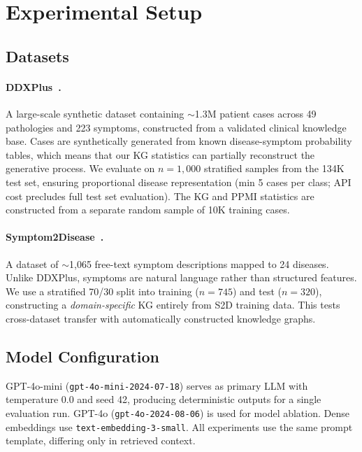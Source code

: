 \documentclass[runningheads]{llncs}
\begin{document}
\section{Experimental Setup}
\label{sec:experiments}

\subsection{Datasets}

\paragraph{DDXPlus~\cite{fansi2022ddxplus}.} A large-scale synthetic dataset containing ${\sim}$1.3M patient cases across 49 pathologies and 223 symptoms, constructed from a validated clinical knowledge base. Cases are synthetically generated from known disease-symptom probability tables, which means that our KG statistics can partially reconstruct the generative process. We evaluate on $n{=}1{,}000$ stratified samples from the 134K test set, ensuring proportional disease representation (min 5 cases per class; API cost precludes full test set evaluation). The KG and PPMI statistics are constructed from a separate random sample of 10K training cases.

\paragraph{Symptom2Disease~\cite{gretelai_s2d}.} A dataset of ${\sim}$1,065 free-text symptom descriptions mapped to 24 diseases. Unlike DDXPlus, symptoms are natural language rather than structured features. We use a stratified 70/30 split into training ($n{=}745$) and test ($n{=}320$), constructing a \emph{domain-specific} KG entirely from S2D training data. This tests cross-dataset transfer with automatically constructed knowledge graphs.

\subsection{Model Configuration}

GPT-4o-mini (\texttt{gpt-4o-mini-2024-07-18}) serves as primary LLM with temperature 0.0 and seed 42, producing deterministic outputs for a single evaluation run. GPT-4o (\texttt{gpt-4o-2024-08-06}) is used for model ablation. Dense embeddings use \texttt{text-embedding-3-small}. All experiments use the same prompt template, differing only in retrieved context.
\end{document}
